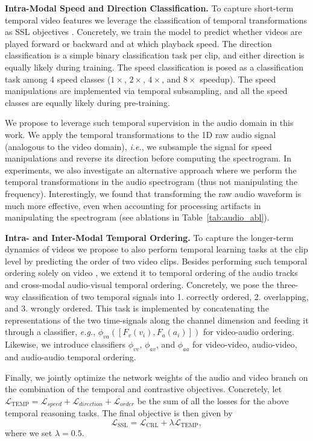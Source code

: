\documentclass[letterpaper]{article}
\newcommand{\eg}{\emph{e.g.}}
\newcommand{\ie}{\emph{i.e.}}
\begin{document}
\noindent \textbf{Intra-Modal Speed and Direction Classification.}
To capture short-term temporal video features we leverage the classification of temporal transformations as SSL objectives \cite{jenni2020video}.
Concretely, we train the model to predict whether videos are played forward or backward and at which playback speed.
The direction classification is a simple binary classification task per clip, and either direction is equally likely during training.
The speed classification is posed as a classification task among 4 speed classes ($1\times$, $2\times$, $4\times$, and $8\times$ speedup). The speed manipulations are implemented via temporal subsampling, and all the speed classes are equally likely during pre-training.

We propose to leverage such temporal supervision in the audio domain in this work.
We apply the temporal transformations to the 1D raw audio signal (analogous to the video domain), \ie, we subsample the signal for speed manipulations and reverse its direction before computing the spectrogram.
In experiments, we also investigate an alternative approach where we perform the temporal transformations in the audio spectrogram (thus not manipulating the frequency). Interestingly, we found that transforming the raw audio waveform is much more effective, even when accounting for processing artifacts in manipulating the spectrogram (see ablations in Table~\ref{tab:audio_abl}).


\noindent \textbf{Intra- and Inter-Modal Temporal Ordering.}
To capture the longer-term dynamics of videos we propose to also perform temporal learning tasks at the clip level by predicting the order of two video clips.
Besides performing such temporal ordering solely on video \cite{jenni2021time,xu2019self,kim2019self}, we extend it to temporal ordering of the audio tracks and cross-modal audio-visual temporal ordering.
Concretely, we pose the three-way classification of two temporal signals into 1. correctly ordered, 2. overlapping, and 3. wrongly ordered.
This task is implemented by concatenating the representations of the two time-signals along the channel dimension and feeding it through a classifier, \eg, $\phi_{va}([F_v(v_i), F_a(a_i)])$ for video-audio ordering.
Likewise, we introduce classifiers $\phi_{vv}$, $\phi_{av}$, and $\phi_{aa}$ for video-video, audio-video, and audio-audio temporal ordering.


Finally, we jointly optimize the network weights of the audio and video branch on the combination of the temporal and contrastive objectives.
Concretely, let $\mathcal{L}_{\operatorname{TEMP}}=\mathcal{L}_{speed}+\mathcal{L}_{direction}+\mathcal{L}_{order}$ be the sum of all the losses for the above temporal reasoning tasks.
The final objective is then given by
\begin{equation}
    \mathcal{L}_{\operatorname{SSL}} = \mathcal{L}_{\operatorname{CRL}} + \lambda \mathcal{L}_{\operatorname{TEMP}},
\end{equation}
where we set $\lambda=0.5$.
\end{document}
